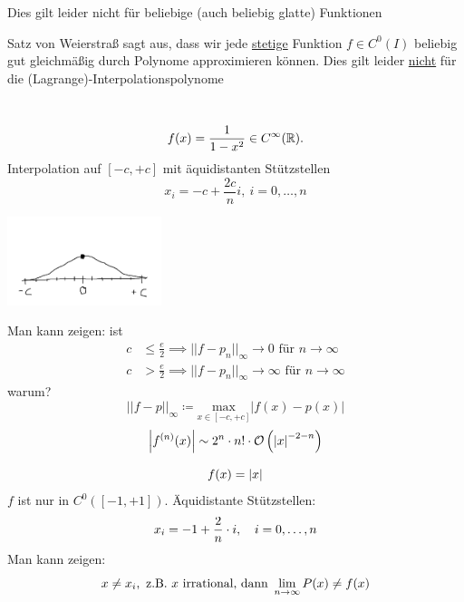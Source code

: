 \documentclass[../Skript.tex]{subfiles}
\begin{document}
\begin{remark}
    Dies gilt leider nicht für beliebige (auch beliebig glatte) Funktionen
\end{remark}

\begin{remark}
    Satz von Weierstraß sagt aus, dass wir jede \underline{stetige} Funktion $f\in C^0(I)$ beliebig gut gleichmäßig durch 
    Polynome approximieren können. Dies gilt leider \underline{nicht} für die (Lagrange)-Interpolationspolynome
\end{remark}
\begin{example}\hfill\\
\[f(x)=\frac{1}{1-x^2}\in C^\infty (\mathbb{R}).
\]
Interpolation auf $[-c,+c]$ mit äquidistanten Stützstellen
\[x_i=-c+\frac{2c}{n}i,\ i=0,\dots,n\] 
\begin{center}
    \includegraphics[width=45mm]{../Bilder/x_2.png}\\
\end{center}
Man kann zeigen: ist
\begin{align*}
    c&\leq \frac{e}{2}\implies ||f-p_n||_\infty \to 0 \text{ 
 für } n\to \infty\\
 c&> \frac{e}{2}\implies ||f-p_n||_\infty \to \infty \text{ 
 für } n\to \infty
\end{align*}
warum?\\
\[||f-p||_\infty\coloneqq\underset{x\in [-c,+c]}{\text{max}}|f(x)-p(x)|\] %
\[\abs{f^{(n)}(x)} \sim 2^n\cdot n! \cdot \calO{ \abs{x}^{-2-n}}\]

\end{example}
\begin{example}
    \[
        f(x) = \left\vert x \right\vert
    \]
    $f$ ist nur in $C^0([-1,+1])$. Äquidistante Stützstellen:\[
    x_i = -1+\frac{2}{n}\cdot i, \hspace{1em} i=0,\dots,n
    \]
    Man kann zeigen:\[
    x\neq x_i, \ \text{z.B. } x \text{ irrational, dann }\lim_{n\to\infty} P(x) \neq f(x)
    \]
\end{example}
\end{document}

